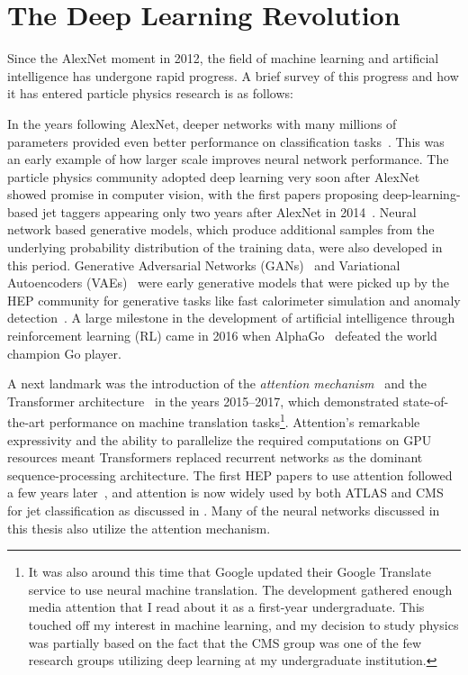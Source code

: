 
\section{The Deep Learning Revolution}
\label{sec:ml_intro}

Since the AlexNet moment in 2012, the field of machine learning and artificial intelligence has undergone rapid progress.
A brief survey of this progress and how it has entered particle physics research is as follows:

In the years following AlexNet, deeper networks with many millions of parameters provided even better performance on classification tasks~\cite{Simonyan:2014vgg,He:2015resnet}.
This was an early example of how larger scale improves neural network performance.
The particle physics community adopted deep learning very soon after AlexNet showed promise in computer vision, with the first papers proposing deep-learning-based jet taggers appearing only two years after AlexNet in 2014~\cite{Cogan:2014oua,Baldi:2014kfa}.
Neural network based generative models, which produce additional samples from the underlying probability distribution of the training data, were also developed in this period.
Generative Adversarial Networks (GANs)~\cite{Goodfellow:2014gan} and Variational Autoencoders (VAEs)~\cite{Kingma:2013vae} were early generative models that were picked up by the HEP community for generative tasks like fast calorimeter simulation and anomaly detection~\cite{deOliveira:2017pjk,Paganini:2017hrr,Paganini:2017dwg,Cerri:2018anq}.
A large milestone in the development of artificial intelligence through reinforcement learning (RL) came in 2016 when AlphaGo~\cite{Silver:2016alphago} defeated the world champion Go player.

A next landmark was the introduction of the \textit{attention mechanism}~\cite{bahdanau2014neural,DBLP:journals/corr/LuongPM15} and the Transformer architecture~\cite{Vaswani:2017attention} in the years 2015--2017, which demonstrated state-of-the-art performance on machine translation tasks\footnote{It was also around this time that Google updated their Google Translate service to use neural machine translation. The development gathered enough media attention that I read about it as a first-year undergraduate. This touched off my interest in machine learning, and my decision to study physics was partially based on the fact that the CMS group was one of the few research groups utilizing deep learning at my undergraduate institution.}.
Attention's remarkable expressivity and the ability to parallelize the required computations on GPU resources meant Transformers replaced recurrent networks as the dominant sequence-processing architecture.
The first HEP papers to use attention followed a few years later~\cite{Mikuni:2020wpr}, and attention is now widely used by both ATLAS and CMS for jet classification as discussed in .
Many of the neural networks discussed in this thesis also utilize the attention mechanism.


